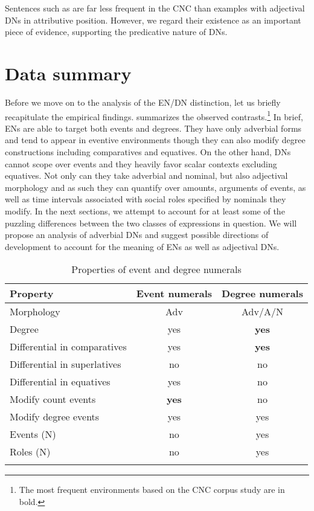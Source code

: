 \documentclass[output=paper,modfonts,hidelinks,newtxmath
\ChapterDOI{10.5281/zenodo.2545513}
]{langscibook}
\begin{document}
\noindent Sentences such as  are far less frequent in the CNC than examples with adjectival DNs in attributive position. However, we regard their existence as an important piece of evidence, supporting the predicative nature of DNs.

\section{Data summary}\label{data-summary}

Before we move on to the analysis of the EN/DN distinction, let us briefly recapitulate the empirical findings.  summarizes the observed contrasts.\footnote{The most frequent environments based on the CNC corpus study are in bold.} In brief, ENs are able to target both events and degrees. They have only adverbial forms and tend to appear in eventive environments though they can also modify degree constructions including comparatives and equatives. On the other hand, DNs cannot scope over events and they heavily favor scalar contexts excluding equatives. Not only can they take adverbial and nominal, but also adjectival morphology and as such they can quantify over amounts, arguments of events, as well as time intervals associated with social roles specified by nominals they modify. In the next sections, we attempt to account for at least some of the puzzling differences between the two classes of expressions in question. We will propose an analysis of adverbial DNs and suggest possible directions of development to account for the meaning of ENs as well as adjectival DNs.

\begin{table}[t]
\caption{Properties of event and degree numerals}\label{table:properties}
\begin{tabular}{lcc}
\lsptoprule
Property & Event numerals & Degree numerals\tabularnewline
\midrule
Morphology & Adv & Adv/A/N\tabularnewline
Degree & yes & \textbf{yes}\tabularnewline
Differential in comparatives & yes & \textbf{yes}\tabularnewline
Differential in superlatives & no & no\tabularnewline
Differential in equatives & yes & no\tabularnewline
Modify count events & \textbf{yes} & no\tabularnewline
Modify degree events & yes & yes\tabularnewline
Events (N) & no & yes\tabularnewline
Roles (N) & no & yes\tabularnewline
\lspbottomrule
\end{tabular}
\end{table}
\end{document}
